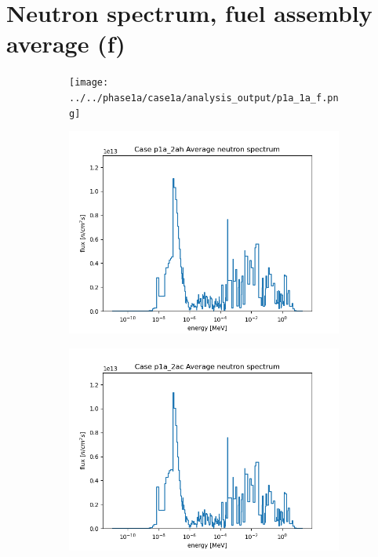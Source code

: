 \documentclass[letterpaper,11pt]{report}
\begin{document}
\section{Neutron spectrum, fuel assembly average (f)}
        \begin{figure}[H]
            \centering
            \begin{subfigure}{.33\textwidth}
                \centering
                \texttt{[image: ../../phase1a/case1a/analysis\_output/p1a\_1a\_f.png]}
                \caption{}
              \end{subfigure}%
              \begin{subfigure}{.33\textwidth}
                \centering
                \includegraphics[width=\linewidth]{../../phase1a/case2ah/analysis_output/p1a_2ah_f.png}
                \caption{}
              \end{subfigure}
              \begin{subfigure}{.33\textwidth}
                \centering
                \includegraphics[width=\linewidth]{../../phase1a/case2ac/analysis_output/p1a_2ac_f.png}

\end{subfigure}
\end{figure}
\end{document}
